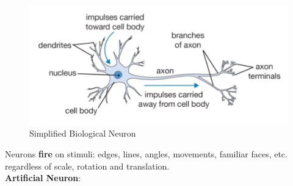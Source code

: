 \begin{figure} [h!t]
    \centering
    \includegraphics[width=0.5\linewidth]{bioneuron.png}
    \caption{Simplified Biological Neuron}
    \label{fig:enter-label}
\end{figure}

Neurons \textbf{fire} on stimuli: edges, lines, angles, movements, familiar faces, etc. regardless of scale, rotation and translation.\\

\textbf{Artificial Neuron}:

